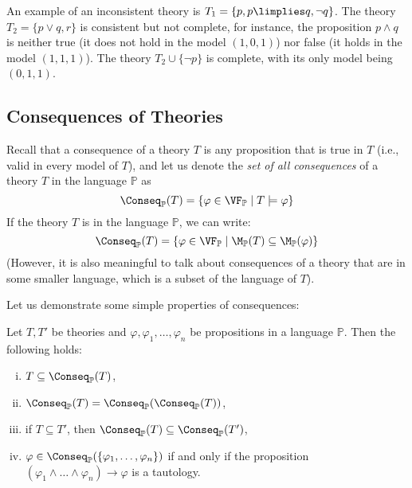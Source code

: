 \begin{example} 
    An example of an inconsistent theory is $T_1 = \{p, p \limplies q, \neg q\}$. The theory $T_2 = \{p \lor q, r\}$ is consistent but not complete, for instance, the proposition $p \land q$ is neither true (it does not hold in the model $(1,0,1)$) nor false (it holds in the model $(1,1,1)$). The theory $T_2 \cup \{\neg p\}$ is complete, with its only model being $(0,1,1)$.
\end{example}


\subsection{Consequences of Theories}

Recall that a consequence of a theory $T$ is any proposition that is true in $T$ (i.e., valid in every model of $T$), and let us denote the \emph{set of all consequences} of a theory $T$ in the language $\mathbb P$ as
$$
\Conseq_\mathbb P(T) = \{\varphi \in \VF_\mathbb P \mid T \models \varphi\}
$$
If the theory $T$ is in the language $\mathbb P$, we can write:
$$
\Conseq_\mathbb P(T) = \{\varphi \in \VF_\mathbb P \mid \M_\mathbb P(T) \subseteq \M_\mathbb P(\varphi)\}
$$
(However, it is also meaningful to talk about consequences of a theory that are in some smaller language, which is a subset of the language of $T$).

Let us demonstrate some simple properties of consequences:
\begin{proposition}\label{proposition:properties-of-consequences}
    Let $T, T'$ be theories and $\varphi, \varphi_1, \dots, \varphi_n$ be propositions in a language $\mathbb P$. Then the following holds:
    \begin{enumerate}[(i)]       
        \item $T \subseteq \Conseq_\mathbb P(T)$,
        \item $\Conseq_\mathbb P(T) = \Conseq_\mathbb P(\Conseq_\mathbb P(T))$,
        \item if $T \subseteq T'$, then $\Conseq_\mathbb P(T) \subseteq \Conseq_\mathbb P(T')$,
        \item $\varphi \in \Conseq_\mathbb P(\{\varphi_1, \dots, \varphi_n\})$ if and only if the proposition $(\varphi_1 \land \dots \land \varphi_n) \to \varphi$ is a tautology.
    \end{enumerate}
\end{proposition}

